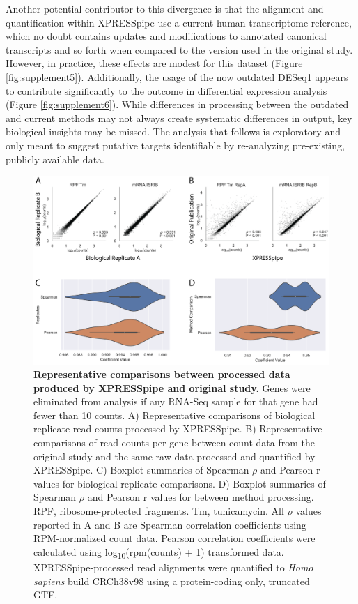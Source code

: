\documentclass[10pt, oneside]{article}
\begin{document}
Another potential contributor to this divergence is that the alignment and quantification within XPRESSpipe use a current human transcriptome reference, which no doubt contains updates and modifications to annotated canonical transcripts and so forth when compared to the version used in the original study. However, in practice, these effects are modest for this dataset (Figure \ref{fig:supplement5}). Additionally, the usage of the now outdated DESeq1 \cite{deseq1} appears to contribute significantly to the outcome in differential expression analysis (Figure \ref{fig:supplement6}). While differences in processing between the outdated and current methods may not always create systematic differences in output, key biological insights may be missed. The analysis that follows is exploratory and only meant to suggest putative targets identifiable by re-analyzing pre-existing, publicly available data.\par

\begin{figure}
\centering
  \includegraphics[width=145mm]{figures/xpresspipe_figure2.png}
  \caption{\textbf{Representative comparisons between processed data produced by XPRESSpipe and original study.} Genes were eliminated from analysis if any RNA-Seq sample for that gene had fewer than 10 counts. A) Representative comparisons of biological replicate read counts processed by XPRESSpipe. B) Representative comparisons of read counts per gene between count data from the original study and the same raw data processed and quantified by XPRESSpipe. C) Boxplot summaries of Spearman $\rho$ and Pearson r values for biological replicate comparisons. D) Boxplot summaries of Spearman $\rho$ and Pearson r values for between method processing. RPF, ribosome-protected fragments. Tm, tunicamycin. All $\rho$ values reported in A and B are Spearman correlation coefficients using RPM-normalized count data. Pearson correlation coefficients were calculated using log\textsubscript{10}(rpm(counts) + 1) transformed data. XPRESSpipe-processed read alignments were quantified to \textit{Homo sapiens} build CRCh38v98 using a protein-coding only, truncated GTF.}
  \label{fig:figure2}
\end{figure}
\end{document}
